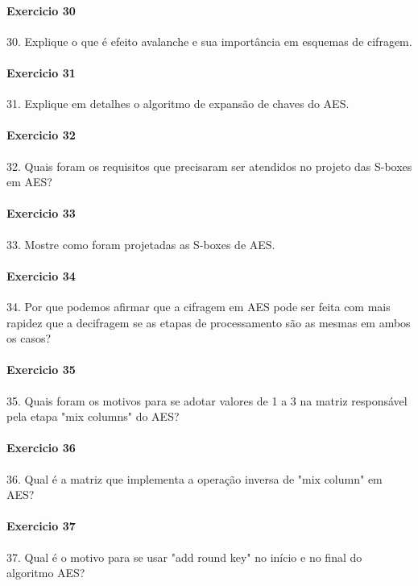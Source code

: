 \documentclass[10pt,a4paper]{report}
\begin{document}
\paragraph{Exercicio 30}
30. Explique o que é efeito avalanche e sua importância em esquemas de cifragem.
\paragraph{Exercicio 31}
31. Explique em detalhes o algoritmo de expansão de chaves do AES.
\paragraph{Exercicio 32}
32. Quais foram os requisitos que precisaram ser atendidos no projeto das S-boxes em AES?
\paragraph{Exercicio 33}
33. Mostre como foram projetadas as S-boxes de AES.
\paragraph{Exercicio 34}
34. Por que podemos afirmar que a cifragem em AES pode ser feita com mais rapidez que a decifragem se as etapas de processamento são as mesmas em ambos os casos?
\paragraph{Exercicio 35}
35. Quais foram os motivos para se adotar valores de 1 a 3 na matriz responsável pela etapa "mix columns" do AES?
\paragraph{Exercicio 36}
36. Qual é a matriz que implementa a operação inversa de "mix column" em AES?
\paragraph{Exercicio 37}
37. Qual é o motivo para se usar "add round key" no início e no final do algoritmo AES?
\end{document}
